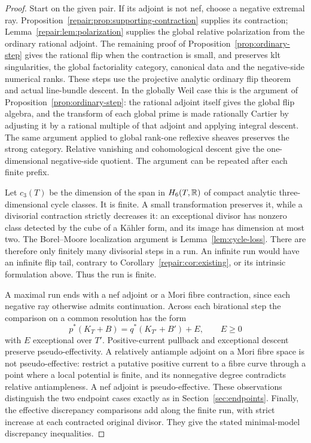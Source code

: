 \begin{proof}
Start on the given pair. If its adjoint is not nef, choose a negative
extremal ray. Proposition~\ref{repair:prop:supporting-contraction} supplies its contraction;
Lemma~\ref{repair:lem:polarization} supplies the global relative polarization
from the ordinary rational adjoint. The remaining proof of Proposition~\ref{prop:ordinary-step} gives the rational flip when the contraction
is small, and preserves klt singularities, the global factoriality
category, canonical data and the negative-side numerical ranks.
These steps use the projective analytic ordinary flip theorem
\cite{Fujino2022} and actual line-bundle descent. In the globally Weil
case this is the argument of Proposition~\ref{prop:ordinary-step}: the rational
adjoint itself gives the global flip algebra, and the transform of
each global prime is made rationally Cartier by adjusting it by a
rational multiple of that adjoint and applying integral descent.
The same argument applied to global rank-one reflexive sheaves
preserves the strong category. Relative vanishing and cohomological
descent give the one-dimensional negative-side quotient. The
argument can be repeated after each finite prefix.

Let $c_3(T)$ be the dimension of the span in $H_6(T,\mathbb R)$ of compact
analytic three-dimensional cycle classes. It is finite. A small
transformation preserves it, while a divisorial contraction strictly
decreases it: an exceptional divisor has nonzero class detected by
the cube of a K\"ahler form, and its image has dimension at most two.
The Borel--Moore localization argument is Lemma~\ref{lem:cycle-loss}.
There are therefore only finitely many divisorial steps in a run.
An infinite run would have an infinite flip tail, contrary to
Corollary~\ref{repair:cor:existing}, or its intrinsic formulation above.
Thus the run is finite.

A maximal run ends with a nef adjoint or a Mori fibre contraction,
since each negative ray otherwise admits continuation. Across each
birational step the comparison on a common resolution has the form
\[
 p^*(K_T+B)=q^*(K_{T'}+B')+E,\qquad E\geq0
\]
with $E$ exceptional over $T'$. Positive-current pullback and
exceptional descent preserve pseudo-effectivity. A relatively
antiample adjoint on a Mori fibre space is not pseudo-effective:
restrict a putative positive current to a fibre curve through a
point where a local potential is finite, and its nonnegative degree
contradicts relative antiampleness. A nef adjoint is pseudo-effective.
These observations distinguish the two endpoint cases exactly as
in Section~\ref{sec:endpoints}. Finally, the effective discrepancy
comparisons add along the finite run, with strict increase at each
contracted original divisor. They give the stated minimal-model
discrepancy inequalities.
\end{proof}
